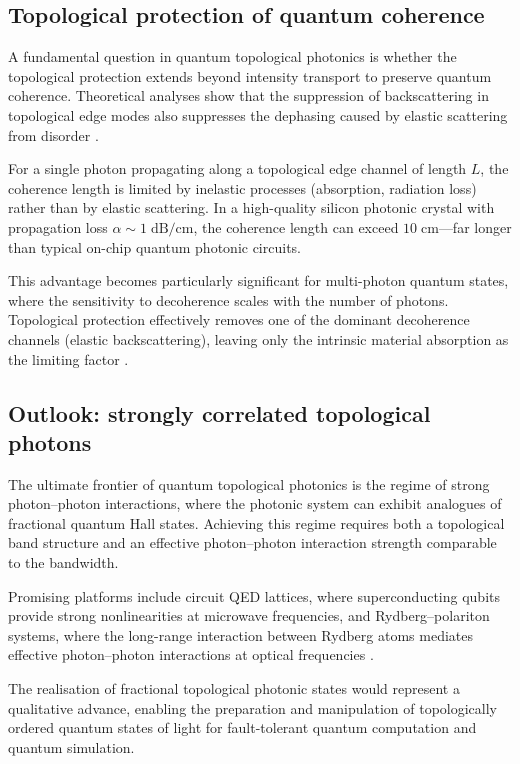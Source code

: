 \subsection{Topological protection of quantum coherence}
\label{sec:ch18-coherence-protection}

A fundamental question in quantum topological photonics is whether
the topological protection extends beyond intensity transport to
preserve quantum coherence.  Theoretical analyses show that the
suppression of backscattering in topological edge modes also
suppresses the dephasing caused by elastic scattering from disorder
\cite{ozawa2018topological}.

For a single photon propagating along a topological edge channel
of length $L$, the coherence length is limited by inelastic
processes (absorption, radiation loss) rather than by elastic
scattering.  In a high-quality silicon photonic crystal with
propagation loss $\alpha\sim 1\;\mathrm{dB/cm}$, the coherence
length can exceed $10\;\mathrm{cm}$---far longer than typical
on-chip quantum photonic circuits.

This advantage becomes particularly significant for multi-photon
quantum states, where the sensitivity to decoherence scales with
the number of photons.  Topological protection effectively removes
one of the dominant decoherence channels (elastic backscattering),
leaving only the intrinsic material absorption as the limiting
factor \cite{price2022roadmap}.

\subsection{Outlook: strongly correlated topological photons}
\label{sec:ch18-strongly-correlated}

The ultimate frontier of quantum topological photonics is the regime
of strong photon--photon interactions, where the photonic system can
exhibit analogues of fractional quantum Hall states.  Achieving this
regime requires both a topological band structure and an effective
photon--photon interaction strength comparable to the bandwidth.

Promising platforms include circuit QED lattices, where
superconducting qubits provide strong nonlinearities at microwave
frequencies, and Rydberg--polariton systems, where the long-range
interaction between Rydberg atoms mediates effective photon--photon
interactions at optical frequencies
\cite{ozawa2018topological,price2022roadmap}.

The realisation of fractional topological photonic states would
represent a qualitative advance, enabling the preparation and
manipulation of topologically ordered quantum states of light for
fault-tolerant quantum computation and quantum simulation.

